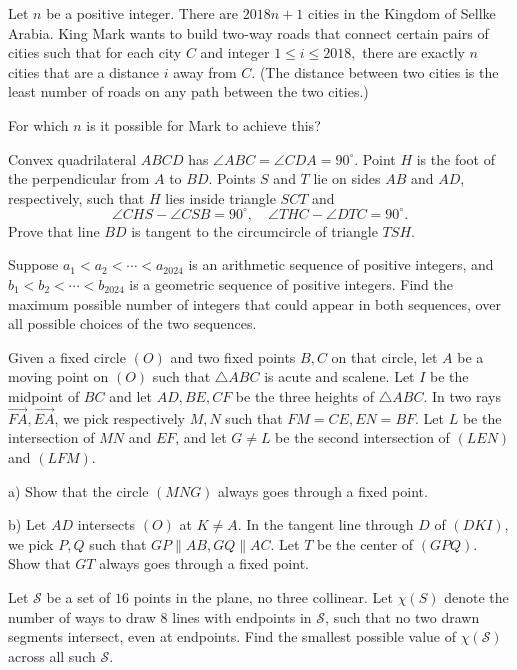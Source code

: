 \documentclass[11pt]{scrartcl}
\begin{document}
\begin{problem}[212792614834869]
Let $n$ be a positive integer. There are $2018n+1$ cities in the Kingdom of Sellke Arabia. King Mark wants to build two-way roads that connect certain pairs of cities such that for each city $C$ and integer $1\le i\le 2018,$ there are exactly $n$ cities that are a distance $i$ away from $C.$ (The distance between two cities is the least number of roads on any path between the two cities.)

For which $n$ is it possible for Mark to achieve this?
\end{problem}
\begin{problem}[5841938333292270043]
Convex quadrilateral $ABCD$ has $\angle ABC = \angle CDA = 90^{\circ}$. Point $H$ is the foot of the perpendicular from $A$ to $BD$. Points $S$ and $T$ lie on sides $AB$ and $AD$, respectively, such that $H$ lies inside triangle $SCT$ and\[
\angle CHS - \angle CSB = 90^{\circ}, \quad \angle THC - \angle DTC = 90^{\circ}. \]Prove that line $BD$ is tangent to the circumcircle of triangle $TSH$.
\end{problem}
\begin{problem}[12311699525330]
	Suppose $a_{1} < a_{2}< \cdots < a_{2024}$ is an arithmetic sequence of positive integers, and $b_{1} <b_{2} < \cdots <b_{2024}$ is a geometric sequence of positive integers. Find the maximum possible number of integers that could appear in both sequences, over all possible choices of the two sequences.
\end{problem}
\begin{problem}[5990443173263547430]
	Given a fixed circle $(O)$ and two fixed points $B, C$ on that circle, let $A$ be a moving point on $(O)$ such that $\triangle ABC$ is acute and scalene. Let $I$ be the midpoint of $BC$ and let $AD, BE, CF$ be the three heights of $\triangle ABC$. In two rays $\overrightarrow{FA}, \overrightarrow{EA}$, we pick respectively $M,N$ such that $FM = CE, EN = BF$. Let $L$ be the intersection of $MN$ and $EF$, and let $G \neq L$ be the second intersection of $(LEN)$ and $(LFM)$.

a) Show that the circle $(MNG)$ always goes through a fixed point.

b) Let $AD$ intersects $(O)$ at $K \neq A$. In the tangent line through $D$ of $(DKI)$, we pick $P,Q$ such that $GP \parallel AB, GQ \parallel AC$. Let $T$ be the center of $(GPQ)$. Show that $GT$ always goes through a fixed point.
\end{problem}
\begin{problem}[711016608896725]
Let $\mathcal S$ be a set of $16$ points in the plane, no three collinear. Let $\chi(S)$ denote the number of ways to draw $8$ lines with endpoints in $\mathcal S$, such that no two drawn segments intersect, even at endpoints. Find the smallest possible value of $\chi(\mathcal S)$ across all such $\mathcal S$.
\end{problem}
\end{document}
